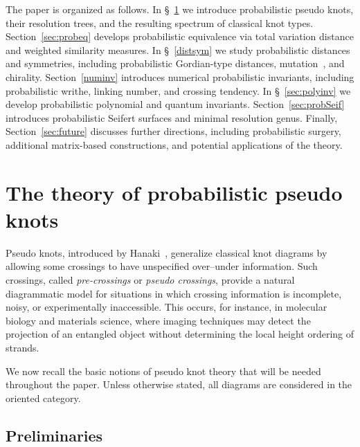 \documentclass[a4paper, reqno, 12pt]{amsart}
\theoremstyle{plain}
\theoremstyle{definition}
\begin{document}
The paper is organized as follows. In \S~\ref{sec:preliminaries} we introduce probabilistic pseudo knots, their resolution trees, and the resulting spectrum of classical knot types. Section~\ref{sec:probeq} develops probabilistic equivalence via total variation distance and weighted similarity measures. In \S~\ref{distsym} we study probabilistic distances and symmetries, including probabilistic Gordian-type distances, mutation~\cites{Co,Ruberman}, and chirality. Section~\ref{numinv} introduces numerical probabilistic invariants, including probabilistic writhe, linking number, and crossing tendency. In \S~\ref{sec:polyinv} we develop probabilistic polynomial and quantum invariants.
Section~\ref{sec:probSeif} introduces probabilistic Seifert surfaces and minimal resolution genus. Finally, Section~\ref{sec:future} discusses further directions, including probabilistic surgery, additional matrix-based constructions, and potential applications of the theory.








\section{The theory of probabilistic pseudo knots}\label{sec:preliminaries}

Pseudo knots, introduced by Hanaki~\cite{H}, generalize classical knot diagrams by allowing some crossings to have unspecified over--under information. Such crossings, called \emph{pre-crossings} or \emph{pseudo crossings}, provide a natural diagrammatic model for situations in which crossing information is incomplete, noisy, or experimentally inaccessible. This occurs, for instance, in molecular biology and materials science, where imaging techniques may detect the projection of an entangled object without determining the local height ordering of strands.

We now recall the basic notions of pseudo knot theory that will be needed throughout the paper. Unless otherwise stated, all diagrams are considered in the oriented category.

\subsection{Preliminaries}
\end{document}
